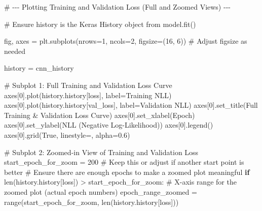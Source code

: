 \documentclass[
  letterpaper,
  DIV=11,
  numbers=noendperiod]{scrreprt}
\newenvironment{Shaded}{\begin{snugshade}}{\end{snugshade}}
\newcommand{\BuiltInTok}[1]{\textcolor[rgb]{0.00,0.23,0.31}{#1}}
\newcommand{\CommentTok}[1]{\textcolor[rgb]{0.37,0.37,0.37}{#1}}
\newcommand{\ControlFlowTok}[1]{\textcolor[rgb]{0.00,0.23,0.31}{\textbf{#1}}}
\newcommand{\DecValTok}[1]{\textcolor[rgb]{0.68,0.00,0.00}{#1}}
\newcommand{\FloatTok}[1]{\textcolor[rgb]{0.68,0.00,0.00}{#1}}
\newcommand{\NormalTok}[1]{\textcolor[rgb]{0.00,0.23,0.31}{#1}}
\newcommand{\OperatorTok}[1]{\textcolor[rgb]{0.37,0.37,0.37}{#1}}
\newcommand{\StringTok}[1]{\textcolor[rgb]{0.13,0.47,0.30}{#1}}
\newcommand{\VariableTok}[1]{\textcolor[rgb]{0.07,0.07,0.07}{#1}}
\begin{document}
\begin{Shaded}
\begin{Highlighting}[]
\CommentTok{\# {-}{-}{-} Plotting Training and Validation Loss (Full and Zoomed Views) {-}{-}{-}}

\CommentTok{\# Ensure \textquotesingle{}history\textquotesingle{} is the Keras History object from model.fit()}

\NormalTok{fig, axes }\OperatorTok{=}\NormalTok{ plt.subplots(nrows}\OperatorTok{=}\DecValTok{1}\NormalTok{, ncols}\OperatorTok{=}\DecValTok{2}\NormalTok{, figsize}\OperatorTok{=}\NormalTok{(}\DecValTok{16}\NormalTok{, }\DecValTok{6}\NormalTok{)) }\CommentTok{\# Adjust figsize as needed}

\NormalTok{history }\OperatorTok{=}\NormalTok{ cnn\_history}

\CommentTok{\# Subplot 1: Full Training and Validation Loss Curve}
\NormalTok{axes[}\DecValTok{0}\NormalTok{].plot(history.history[}\StringTok{\textquotesingle{}loss\textquotesingle{}}\NormalTok{], label}\OperatorTok{=}\StringTok{\textquotesingle{}Training NLL\textquotesingle{}}\NormalTok{)}
\NormalTok{axes[}\DecValTok{0}\NormalTok{].plot(history.history[}\StringTok{\textquotesingle{}val\_loss\textquotesingle{}}\NormalTok{], label}\OperatorTok{=}\StringTok{\textquotesingle{}Validation NLL\textquotesingle{}}\NormalTok{)}
\NormalTok{axes[}\DecValTok{0}\NormalTok{].set\_title(}\StringTok{\textquotesingle{}Full Training \& Validation Loss Curve\textquotesingle{}}\NormalTok{)}
\NormalTok{axes[}\DecValTok{0}\NormalTok{].set\_xlabel(}\StringTok{\textquotesingle{}Epoch\textquotesingle{}}\NormalTok{)}
\NormalTok{axes[}\DecValTok{0}\NormalTok{].set\_ylabel(}\StringTok{\textquotesingle{}NLL (Negative Log{-}Likelihood)\textquotesingle{}}\NormalTok{)}
\NormalTok{axes[}\DecValTok{0}\NormalTok{].legend()}
\NormalTok{axes[}\DecValTok{0}\NormalTok{].grid(}\VariableTok{True}\NormalTok{, linestyle}\OperatorTok{=}\StringTok{\textquotesingle{}{-}{-}\textquotesingle{}}\NormalTok{, alpha}\OperatorTok{=}\FloatTok{0.6}\NormalTok{)}

\CommentTok{\# Subplot 2: Zoomed{-}in View of Training and Validation Loss}
\NormalTok{start\_epoch\_for\_zoom }\OperatorTok{=} \DecValTok{200}  \CommentTok{\# Keep this or adjust if another start point is better}
\CommentTok{\# Ensure there are enough epochs to make a zoomed plot meaningful}
\ControlFlowTok{if} \BuiltInTok{len}\NormalTok{(history.history[}\StringTok{\textquotesingle{}loss\textquotesingle{}}\NormalTok{]) }\OperatorTok{\textgreater{}}\NormalTok{ start\_epoch\_for\_zoom:}
    \CommentTok{\# X{-}axis range for the zoomed plot (actual epoch numbers)}
\NormalTok{    epoch\_range\_zoomed }\OperatorTok{=} \BuiltInTok{range}\NormalTok{(start\_epoch\_for\_zoom, }\BuiltInTok{len}\NormalTok{(history.history[}\StringTok{\textquotesingle{}loss\textquotesingle{}}\NormalTok{]))}


\end{Highlighting}
\end{Shaded}
\end{document}

